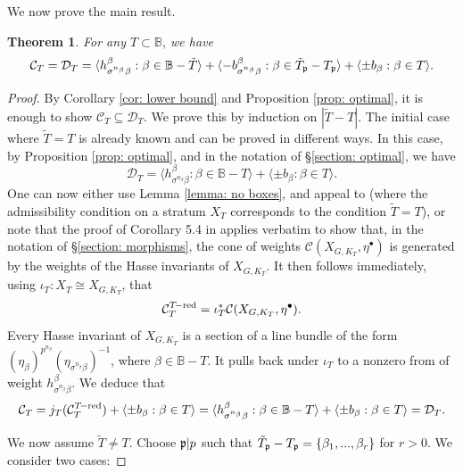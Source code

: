 \documentclass[11pt,pdflatex]{amsart}
\theoremstyle{plain}
\theoremstyle{definition}
\theoremstyle{plain}
\newtheorem{thm}[theorem]{Theorem}
\theoremstyle{definition}
\theoremstyle{remark}
\numberwithin{equation}{section}
\numberwithin{figure}{section} \numberwithin{table}{subsection}
\newcommand{\gerp}{{\frak{p}}}
\newcommand{\calC}{{\mathcal{C}}}
\newcommand{\calD}{{\mathcal{D}}}
\def\BB{\mathbb{B}}
\begin{document}
We now prove the main result.


\begin{thm} \label{thm:main}For any $T \subset \BB$, we have $$\calC_T=\calD_T=\langle h_{\sigma^{n_\beta}{\beta}}^\beta: \beta \in \BB-\tilde{T} \rangle    + \langle-b_{\sigma^{n_\beta}\beta}^\beta: \beta \in \tilde{T}_\gerp-T_\gerp \rangle + \langle \pm b_\beta: \beta \in T \rangle.$$

\end{thm}



\begin{proof} By Corollary \ref{cor: lower bound} and Proposition \ref{prop: optimal}, it is enough to show $\calC_T \subseteq \calD_T$. We
 prove this by induction on $|\tilde{T}-T|$. The initial case where $\tilde{T}=T$ is already known and can be proved in different ways. In this case, by Proposition \ref{prop: optimal}, and in the notation of \S \ref{section: optimal}, we have 
$$\calD_T=\langle h_{\sigma^{n_\beta}{\beta}}^\beta: \beta \in \BB-T \rangle + \langle \pm b_\beta: \beta \in T \rangle.$$
One can now either use Lemma \ref{lemma: no boxes}, and  appeal to \cite{GK} (where the admissibility condition on a stratum $X_T$ corresponds to the condition $\tilde{T}=T$), or note that the proof of  Corollary 5.4 in \cite{DK1} applies verbatim to show that, in the notation of \S \ref{section: morphisms}, the cone of weights  $\calC(X_{G,K_T},\eta^\bullet)$ is generated by the weights of the  Hasse invariants of $X_{G,K_T}$. It then follows immediately, using $\iota_T: X_T \cong X_{G,K_T}$, that $$\calC_T^{T\!-\rm red}=\iota_T^*\calC(X_{G,K_T},\eta^\bullet).$$ Every Hasse invariant of $X_{G,K_T}$ is a section of a line bundle of the form $(\eta_{\beta})^{p^{n_\beta}}(\eta_{\sigma^{n_\beta}\beta})^{-1}$, where $\beta \in \BB-T$. It pulls back under $\iota_T$ to a nonzero from of weight $h_{\sigma^{n_\beta}\beta}^\beta$.  We deduce that 
$$\calC_T=j_T(\calC_T^{T\!-\rm red})+ \langle \pm b_\beta: \beta \in T\rangle = \langle h_{\sigma^{n_\beta}{\beta}}^\beta: \beta \in \BB-T \rangle + \langle \pm b_\beta: \beta \in T \rangle=\calD_T.$$

We now assume $\tilde{T} \neq T$. Choose $\gerp|p$ such that $\tilde{T}_\gerp-T_\gerp=\{\beta_1,...,\beta_r\}$ for $r>0$. We consider two cases: 

\vspace{2mm}


\end{proof}
\end{document}
